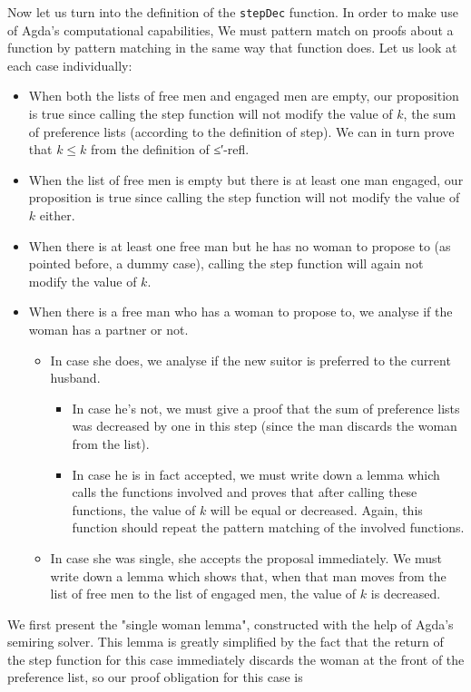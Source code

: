 {Now let us turn into the definition of the \texttt{stepDec} function. In order to make use of Agda's computational capabilities, We must pattern match on proofs about a function by pattern matching in the same way that function does. Let us look at each case individually:

\begin{itemize}
  \item When both the lists of free men and engaged men are empty, our proposition is true since calling the step function will not modify the value of $k$, the sum of preference lists (according to the definition of step). We can in turn prove that $k \le k$ from the definition of ≤′-refl.
  \item When the list of free men is empty but there is at least one man engaged, our proposition is true since calling the step function will not modify the value of $k$ either.
  \item When there is at least one free man but he has no woman to propose to (as pointed before, a dummy case), calling the step function will again not modify the value of $k$.
  \item When there is a free man who has a woman to propose to, we analyse if the woman has a partner or not.
    \begin{itemize}
      \item In case she does, we analyse if the new suitor is preferred to the current husband.
        \begin{itemize}
          \item In case he's not, we must give a proof that the sum of preference lists was decreased by one in this step (since the man discards the woman from the list).
          \item In case he is in fact accepted, we must write down a lemma which calls the functions involved and proves that after calling these functions, the value of $k$ will be equal or decreased. Again, this function should repeat the pattern matching of the involved functions.
        \end{itemize}
      \item In case she was single, she accepts the proposal immediately. We must write down a lemma which shows that, when that man moves from the list of free men to the list of engaged men, the value of $k$ is decreased.
    \end{itemize}
\end{itemize}

We first present the "single woman lemma", constructed with the help of Agda's semiring solver. This lemma is greatly simplified by the fact that the return of the step function for this case immediately discards the woman at the front of the preference list, so our proof obligation for this case is

}
